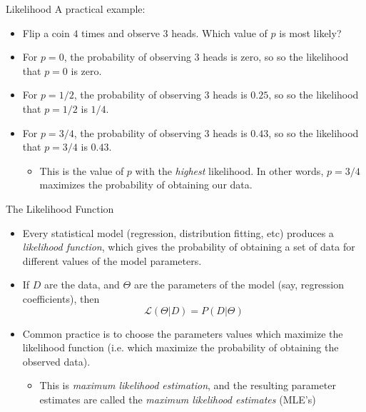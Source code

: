 \documentclass{beamer}
\begin{document}
\begin{frame}{Likelihood}
A practical example:
        \begin{itemize}
                \item Flip a coin $4$ times and observe $3$ heads. Which value of $p$ is
                         most likely?
                \item For $p = 0$, the probability of observing $3$ heads is zero, so
                          so the likelihood that $p=0$ is zero.
                \item For $p = 1/2$, the probability of observing $3$ heads is $0.25$, so
                          so the likelihood that $p=1/2$ is $1/4$.
                \item For $p = 3/4$, the probability of observing $3$ heads is $0.43$, so
                          so the likelihood that $p=3/4$ is $0.43$.
                          \begin{itemize}
                                  \item This is the value of $p$ with the \emph{highest} 
                                            likelihood. In other words, $p = 3/4$ maximizes the 
                                            probability of obtaining our data.
                          \end{itemize}
        \end{itemize}
\end{frame}

\begin{frame}{The Likelihood Function}
        \begin{itemize}
                \item Every statistical model (regression, distribution fitting, etc) produces
                          a \emph{likelihood function}, which gives the probability of 
                          obtaining a set of data for different values of the model parameters.
                \item If $D$ are the data, and $\Theta$ are the parameters of the model 
                         (say, regression coefficients), then
                                 \[ \mathcal{L}(\Theta|D) = P(D|\Theta) \]
                \item Common practice is to choose the parameters values which 
                          maximize the likelihood function (i.e. which maximize the 
                          probability of obtaining the observed data).
                          \begin{itemize}
                                  \item This is \emph{maximum likelihood estimation}, and the
                                            resulting parameter estimates are called the 
                                            \emph{maximum likelihood estimates} (MLE's)
                          \end{itemize}
        \end{itemize}
\end{frame}
\end{document}
